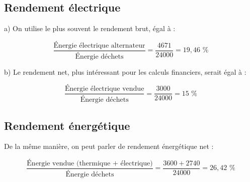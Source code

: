 \subsection{Rendement électrique}

a) On utilise le plus souvent le rendement brut, égal à :

\begin{equation}
\frac{\text{Énergie électrique alternateur}}{\text{Énergie déchets}}=\frac{4 671}{24 000}    = 19,46 \text{ \%}
\end{equation}


b) Le rendement net, plus intéressant pour les calculs financiers, serait égal à :

\begin{equation}
\frac{\text{Énergie électrique vendue}}{\text{Énergie déchets}}=\frac{3 000}{24 000}    = 15 \text{ \%}
\end{equation}



 
\subsection{Rendement énergétique}

De la même manière, on peut parler de rendement énergétique net :


\begin{equation}
\frac{\text{Énergie vendue (thermique + électrique)}}{\text{Énergie déchets}}=\frac{3 600+2740}{24 000}    = 26,42 \text{ \%}
\end{equation}
